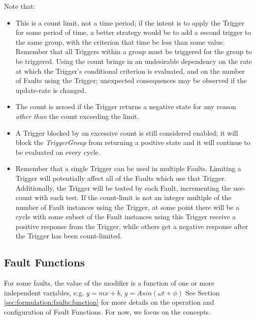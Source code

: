 \documentclass[11pt,fleqn]{report}
\begin{document}
Note that:
\begin{itemize}
 \item This is a count limit, not a time period; if the intent is to apply
   the Trigger for some period of time, a better strategy would be to add a
   second trigger to the same group, with the criterion that time be less
   than some value. Remember that all Triggers within a group must be
   triggered for the group to be triggered.
   Using the count brings in an undesirable dependency on the rate at
   which the Trigger's conditional criterion is evaluated, and on the number
   of Faults using the Trigger;
   unexpected consequences may be observed if the update-rate is changed.
 \item The count is zeroed if the Trigger returns a negative state for any
   reason \textit{other than} the count exceeding the limit.
 \item A Trigger blocked by an excessive count is still considered enabled;
   it will block the \textit{TriggerGroup} from returning a positive state
   and it will continue to be evaluated on every cycle.
 \item Remember that a single Trigger can be used in multiple Faults.
   Limiting a Trigger will potentially affect all of the Faults which use that
   Trigger. Additionally, the Trigger will be tested by each Fault,
   incrementing the use-count with each test. If the count-limit is not an
   integer multiple of the number of Fault instances using the Trigger, at
   some point there will be a cycle with some subset of the Fault instances
   using this Trigger receive a positive response from the Trigger, while
   others get a negative response after the Trigger has been count-limited.
\end{itemize}

\subsection{Fault Functions} \label{sec:formulation:concept:functionss}
For some faults, the value of the modifier is a function of one or more
independent variables, e.g. $y=mx+b$, $y=A sin(\omega t + \phi)$
See Section \ref{sec:formulation:faults:function} for more details on the
operation and configuration of Fault Functions. For now, we focus on the
concepts.
\end{document}
